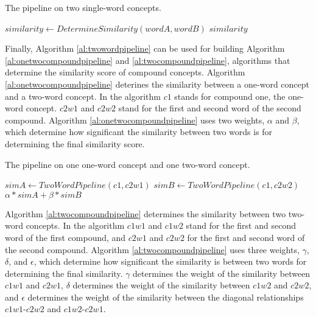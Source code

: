\documentclass{article}
\begin{document}
\begin{algorithm}
\caption{The pipeline on two single-word concepts.}\label{al:twowordpipeline}
\begin{algorithmic}[1]
		\State $\textit{similarity} \gets \textit{DetermineSimilarity}(wordA, wordB)$
				\State {}
			\EndIf
		\EndIf
		\State \Return $\textit{similarity}$
	\EndProcedure
\end{algorithmic}
\end{algorithm}

Finally, Algorithm \ref{al:twowordpipeline} can be used for building Algorithm \ref{al:onetwocompoundpipeline} and \ref{al:twocompoundpipeline}, algorithms that determine the similarity score of compound concepts. Algorithm \ref{al:onetwocompoundpipeline} deterines the similarity between a one-word concept and a two-word concept. In the algorithm $c1$ stands for compound one, the one-word concept. $c2w1$ and $c2w2$ stand for the first and second word of the second compound. Algorithm \ref{al:onetwocompoundpipeline} uses two weights, $\alpha$ and $\beta$, which determine how significant the similarity between two words is for determining the final similarity score.

\begin{algorithm}
\caption{The pipeline on one one-word concept and one two-word concept.}\label{al:onetwocompoundpipeline}
\begin{algorithmic}[1]
		\State $\textit{simA} \gets \textit{TwoWordPipeline}(c1, c2w1)$
		\State $\textit{simB} \gets \textit{TwoWordPipeline}(c1, c2w2)$
		\State \Return $\alpha * \textit{simA} + \beta * \textit{simB}$
	\EndProcedure
\end{algorithmic}
\end{algorithm}

Algorithm \ref{al:twocompoundpipeline} determines the similarity between two two-word concepts. In the algorithm $c1w1$ and $c1w2$ stand for the first and second word of the first compound, and $c2w1$ and $c2w2$ for the first and second word of the second compound. Algorithm \ref{al:twocompoundpipeline} uses three weights, $\gamma$, $\delta$, and $\epsilon$, which determine how significant the similarity is between two words for determining the final similarity. $\gamma$ determines the weight of the similarity between $c1w1$ and $c2w1$, $\delta$ determines the weight of the similarity between $c1w2$ and $c2w2$, and $\epsilon$ determines the weight of the similarity between the diagonal relationships $c1w1$-$c2w2$ and $c1w2$-$c2w1$.
\end{document}
